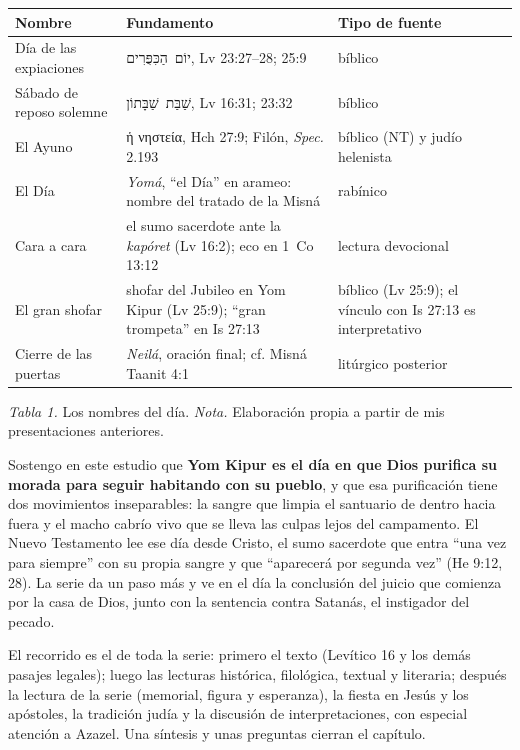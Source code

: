 \documentclass[11pt,letterpaper]{article}
\newcommand{\heb}[1]{\mbox{\foreignlanguage{hebrew}{#1}}}
\newcommand{\grc}[1]{\foreignlanguage{ancientgreek}{#1}}
\newcommand{\destacar}[1]{\textbf{\textcolor{tierraroja}{#1}}}
\begin{document}
\begin{center}\small\renewcommand{\arraystretch}{1.18}
\begin{tabular}{@{}L{3.3cm}L{6.4cm}L{5.0cm}@{}}
\toprule
\textbf{Nombre} & \textbf{Fundamento} & \textbf{Tipo de fuente} \\ \midrule
Día de las expiaciones & \heb{יוֹם הַכִּפֻּרִים}, Lv 23:27--28; 25:9 & bíblico \\
Sábado de reposo solemne & \heb{שַׁבַּת שַׁבָּתוֹן}, Lv 16:31; 23:32 & bíblico \\
El Ayuno & \grc{ἡ νηστεία}, Hch 27:9; Filón, \emph{Spec.} 2.193 & bíblico (NT) y judío helenista \\
El Día & \emph{Yomá}, ``el Día'' en arameo: nombre del tratado de la Misná & rabínico \\
Cara a cara & el sumo sacerdote ante la \emph{kapóret} (Lv 16:2); eco en 1~Co 13:12 & lectura devocional \\
El gran shofar & shofar del Jubileo en Yom Kipur (Lv 25:9); ``gran trompeta'' en Is 27:13 & bíblico (Lv 25:9); el vínculo con Is 27:13 es interpretativo \\
Cierre de las puertas & \emph{Neilá}, oración final; cf. Misná Taanit 4:1 & litúrgico posterior \\
\bottomrule
\end{tabular}\par
{\footnotesize\color{sepia}\textit{Tabla 1.} Los nombres del día. \textit{Nota.} Elaboración propia a partir de mis presentaciones anteriores.}
\end{center}

Sostengo en este estudio que \destacar{Yom Kipur es el día en que Dios purifica su morada para seguir habitando con su pueblo}, y que esa purificación tiene dos movimientos inseparables: la sangre que limpia el santuario de dentro hacia fuera y el macho cabrío vivo que se lleva las culpas lejos del campamento. El Nuevo Testamento lee ese día desde Cristo, el sumo sacerdote que entra ``una vez para siempre'' con su propia sangre y que ``aparecerá por segunda vez'' (He 9:12, 28). La serie da un paso más y ve en el día la conclusión del juicio que comienza por la casa de Dios, junto con la sentencia contra Satanás, el instigador del pecado.

El recorrido es el de toda la serie: primero el texto (Levítico 16 y los demás pasajes legales); luego las lecturas histórica, filológica, textual y literaria; después la lectura de la serie (memorial, figura y esperanza), la fiesta en Jesús y los apóstoles, la tradición judía y la discusión de interpretaciones, con especial atención a Azazel. Una síntesis y unas preguntas cierran el capítulo.
\end{document}
